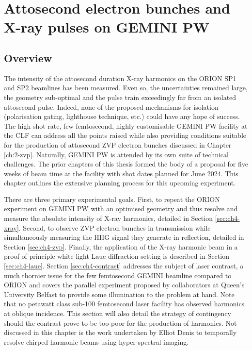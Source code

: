 \chapter{\label{ch:4-gemini}Attosecond electron bunches and X-ray pulses on GEMINI PW} 

\minitoc

\section{Overview}
The intensity of the attosecond duration X-ray harmonics on the ORION SP1 and SP2 beamlines has been measured. Even so, the uncertainties remained large, the geometry sub-optimal and the pulse train exceedingly far from an isolated attosecond pulse. Indeed, none of the proposed mechanisms for isolation (polarisation gating, lighthouse technique, etc.) could have any hope of success. The high shot rate, few femtosecond, highly customisable GEMINI PW facility at the CLF can address all the points raised while also providing conditions suitable for the production of attosecond ZVP electron bunches discussed in Chapter \ref{ch:2-zvp}. Naturally, GEMINI PW is attended by its own suite of technical challenges. The prior chapters of this thesis formed the body of a proposal for five weeks of beam time at the facility with shot dates planned for June 2024. This chapter outlines the extensive planning process for this upcoming experiment.

There are three primary experimental goals. First, to repeat the ORION experiment on GEMINI PW with an optimised geometry and thus resolve and measure the absolute intensity of X-ray harmonics, detailed in Section \ref{sec:ch4-xray}. Second, to observe ZVP electron bunches in transmission while simultaneously measuring the HHG signal they generate in reflection, detailed in Section \ref{sec:ch4-zvp}. Finally, the application of the X-ray harmonic beam in a proof of principle white light Laue diffraction setting is described in Section \ref{sec:ch4-laue}. Section \ref{sec:ch4-contrast} addresses the subject of laser contrast, a much thornier issue for the few femtosecond GEMINI beamline compared to ORION and covers the parallel experiment proposed by collaborators at Queen's University Belfast to provide some illumination to the problem at hand. Note that no petawatt class sub-100 femtosecond laser facility has observed harmonics at oblique incidence. This section will also detail the strategy of contingency should the contrast prove to be too poor for the production of harmonics. Not discussed in this chapter is the work undertaken by Elliot Denis to temporally resolve chirped harmonic beams using hyper-spectral imaging.


